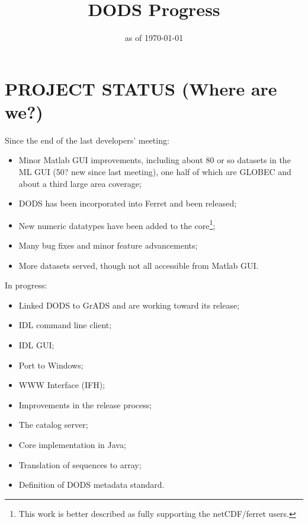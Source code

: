 \documentclass[10pt]{article}
\begin{document}

\W\newcommand{\textsf}{\textit}
\T\setlength{\parindent}{0pt}
\T\setlength{\parskip}{\medskipamount}
\T\renewcommand{\rmdefault}{ptm}
\T\renewcommand{\sfdefault}{phv}
\T\renewcommand{\ttdefault}{cmtt}
\T\setmarginsrb{1in}{1in}{1in}{1.5in}{0pt}{0mm}{0pt}{0mm}

\title{DODS Progress}
\author{}
\date{as of \today}

\maketitle

\T\tableofcontents

\section{PROJECT STATUS (Where are we?)}

Since the end of the last developers' meeting:

\begin{itemize}
\item Minor Matlab GUI improvements, including about 80 or so datasets
  in the ML GUI (50? new since last meeting), one half of which are
  GLOBEC and about a third large area coverage;
\item DODS has been incorporated into Ferret and been released;
\item New numeric datatypes have been added to the core\footnote{This
    work is better described as fully supporting the netCDF/ferret
    users.};
\item Many bug fixes and minor feature advancements;
\item More datasets served, though not all accessible from Matlab GUI.
\end{itemize}

In progress:

\begin{itemize}
  \item Linked DODS to GrADS and are working toward its release;
  \item IDL command line client;
  \item IDL GUI;
  \item Port to Windows;
  \item WWW Interface (IFH);
  \item Improvements in the release process;
  \item The catalog server;
  \item Core implementation in Java;
  \item Translation of sequences to array;
  \item Definition of  DODS metadata standard.
\end{itemize}
\end{document}
